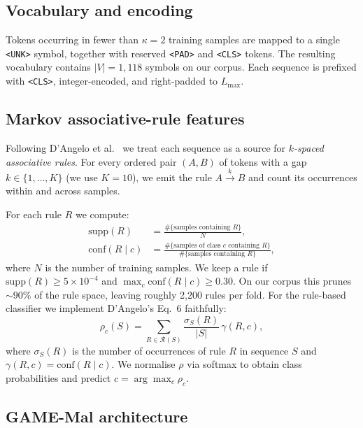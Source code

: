 \subsection{Vocabulary and encoding}

Tokens occurring in fewer than $\kappa=2$ training samples are
mapped to a single \texttt{<UNK>} symbol, together with reserved
\texttt{<PAD>} and \texttt{<CLS>} tokens. The resulting vocabulary
contains $|V|=1{,}118$ symbols on our corpus. Each sequence is
prefixed with \texttt{<CLS>}, integer-encoded, and right-padded to
$L_{\max}$.

\subsection{Markov associative-rule features}
\label{sec:markov}

Following D'Angelo et al.~\cite{dangelo2023association} we treat each
sequence as a source for \emph{$k$-spaced associative rules}. For
every ordered pair $(A,B)$ of tokens with a gap $k \in \{1,\ldots,K\}$
(we use $K=10$), we emit the rule $A \xrightarrow{k} B$ and count
its occurrences within and across samples.

For each rule $R$ we compute:
\begin{align}
  \mathrm{supp}(R) &= \frac{\#\{\text{samples containing }R\}}{N},\\
  \mathrm{conf}(R \mid c) &= \frac{\#\{\text{samples of class }c\text{ containing }R\}}{\#\{\text{samples containing }R\}},
\end{align}
where $N$ is the number of training samples. We keep a rule if
$\mathrm{supp}(R) \geq 5\times 10^{-4}$ and
$\max_c \mathrm{conf}(R \mid c) \geq 0.30$. On our corpus this
prunes $\sim\!90\%$ of the rule space, leaving roughly 2{,}200 rules
per fold. For the rule-based classifier we implement D'Angelo's
Eq.~6 faithfully:
\begin{equation}
  \rho_c(S) = \sum_{R \in \mathcal{R}(S)}
  \frac{\sigma_S(R)}{|S|}\,\gamma(R, c),
  \label{eq:rho}
\end{equation}
where $\sigma_S(R)$ is the number of occurrences of rule $R$ in
sequence $S$ and $\gamma(R, c) = \mathrm{conf}(R\mid c)$. We
normalise $\rho$ via softmax to obtain class probabilities and
predict $\hat{c} = \arg\max_c \rho_c$.

\subsection{GAME-Mal architecture}
\label{sec:arch}

